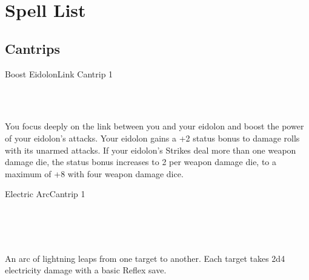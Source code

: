 \documentclass[12pt,openany,twocolumn]{book}
\begin{document}

\author{Jason Weatherly}
\chapter*{Spell List}

\section*{Cantrips}

\begin{spell}{Boost Eidolon}{}{Link Cantrip 1}
    \begin{spellinfo}
         \\
         \\
    \end{spellinfo}

    \begin{spellbody}
        You focus deeply on the link between you and your eidolon and boost the power of your eidolon's attacks. Your eidolon gains a +2 status bonus to damage rolls with its unarmed attacks. If your eidolon's Strikes deal more than one weapon damage die, the status bonus increases to 2 per weapon damage die, to a maximum of +8 with four weapon damage dice.
    \end{spellbody}

\end{spell}

\begin{spell}{Electric Arc}{}{Cantrip 1}
    \begin{spellinfo}
         \\
         \\
         \\
    \end{spellinfo}

    \begin{spellbody}
        An arc of lightning leaps from one target to another. Each target takes 2d4 electricity damage with a basic Reflex save.
    \end{spellbody}


\end{spell}
\end{document}
